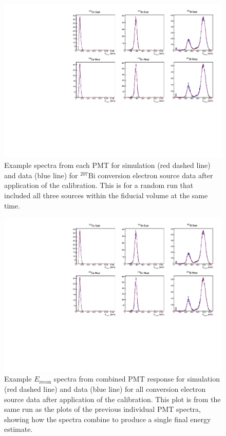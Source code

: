 \begin{figure}
  \centering
  \includegraphics[scale=1,page=4]{4-UCNACalibrations/run_17523.pdf}
  \caption{Example spectra from each PMT for simulation (red dashed line) and data (blue line) for $^{207}\mathrm{Bi}$ conversion electron source
    data after application of the calibration. This is for a random run that included all three sources within the fiducial
    volume at the same time.}
  \label{fig:Bi_spectra}
\end{figure}

\begin{figure}
  \centering
  \includegraphics[scale=1,page=1]{4-UCNACalibrations/run_17523.pdf}
  \caption{Example $E_{\mathrm{recon}}$ spectra from combined PMT response
    for simulation (red dashed line) and data (blue line) for all conversion electron source data
    after application of the calibration. This plot is from the same run as the plots of the previous individual
    PMT spectra, showing how the spectra combine to produce a single final energy estimate.}
  \label{fig:Erecon_spectra}
\end{figure}



